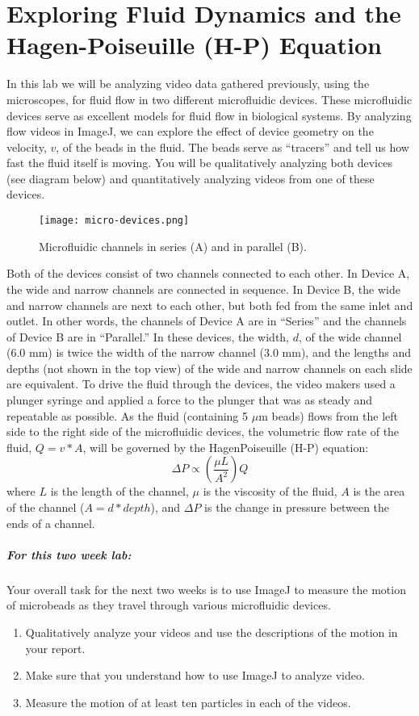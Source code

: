 \chapter{Exploring Fluid Dynamics and the Hagen-Poiseuille (H-P) Equation}
\thispagestyle{fancy}
%
In this lab we will be analyzing video data gathered previously, using the microscopes, for
fluid flow in two different microfluidic devices.
These microfluidic devices serve as excellent models for fluid flow in biological systems.
By analyzing flow videos in ImageJ, we can explore the effect of device geometry on the velocity, $v$, of the beads in the fluid.
The beads serve as ``tracers'' and tell us how fast the fluid itself is moving.
You will be qualitatively analyzing both devices (see diagram below) and quantitatively analyzing videos from one of these devices.

\begin{figure}[hbtp]
	\centering
	\texttt{[image: micro-devices.png]}
	\caption{Microfluidic channels in series (A) and in parallel (B).}
	\label{fig:series-parallel}
\end{figure}

Both of the devices consist of two channels connected to each other.
In Device A, the wide and narrow channels are connected in sequence.
In Device B, the wide and narrow channels are next to each other, but both fed from the same inlet and outlet.
In other words, the channels of Device A are in ``Series'' and the channels of Device B are in ``Parallel.''
In these devices, the width, $d$, of the wide channel (6.0 mm) is twice the width of the narrow channel (3.0 mm), and the lengths and depths (not shown in the top view) of the wide and narrow channels on each slide are equivalent.
To drive the fluid through the devices, the video makers used a plunger syringe and applied a force to the plunger that was as steady and repeatable as possible.
\newpage
As the fluid (containing 5 $\mu$m beads) flows from the left side to the right side of the
microfluidic devices, the volumetric flow rate of the fluid, $Q = v*A$, will be governed by the HagenPoiseuille (H-P) equation:
\[ \Delta P \propto \left( \frac{\mu L}{A^{2}} \right) Q \]
where $L$ is the length of the channel, $\mu$ is the viscosity of the fluid, $A$ is the area of the channel ($A = d*depth$), and $\Delta P$ is the change in pressure between the ends of a channel.

\paragraph{For this two week lab:} Your overall task for the next two weeks is to use ImageJ to measure the motion of microbeads as they travel through various microfluidic devices.
\begin{enumerate}
\itemsep-0.2em
\item Qualitatively analyze your videos and use the descriptions of the motion in your report.
\item Make sure that you understand how to use ImageJ to analyze video.
\item Measure the motion of at least ten particles in each of the videos.
\end{enumerate}

